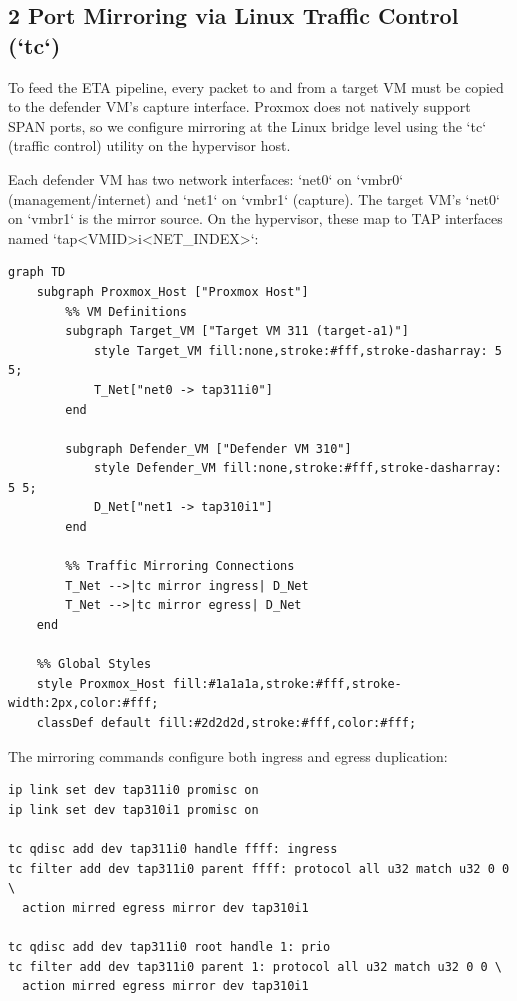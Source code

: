 \documentclass[conference]{IEEEtran}
\begin{document}
\subsection{2 Port Mirroring via Linux Traffic Control (`tc`)}

To feed the ETA pipeline, every packet to and from a target VM must be copied to the defender VM's capture interface. Proxmox does not natively support SPAN ports, so we configure mirroring at the Linux bridge level using the `tc` (traffic control) utility on the hypervisor host.

Each defender VM has two network interfaces: `net0` on `vmbr0` (management/internet) and `net1` on `vmbr1` (capture). The target VM's `net0` on `vmbr1` is the mirror source. On the hypervisor, these map to TAP interfaces named `tap<VMID>i<NET\_INDEX>`:

\begin{verbatim}
graph TD
    subgraph Proxmox_Host ["Proxmox Host"]
        %% VM Definitions
        subgraph Target_VM ["Target VM 311 (target-a1)"]
            style Target_VM fill:none,stroke:#fff,stroke-dasharray: 5 5;
            T_Net["net0 -> tap311i0"]
        end

        subgraph Defender_VM ["Defender VM 310"]
            style Defender_VM fill:none,stroke:#fff,stroke-dasharray: 5 5;
            D_Net["net1 -> tap310i1"]
        end

        %% Traffic Mirroring Connections
        T_Net -->|tc mirror ingress| D_Net
        T_Net -->|tc mirror egress| D_Net
    end

    %% Global Styles
    style Proxmox_Host fill:#1a1a1a,stroke:#fff,stroke-width:2px,color:#fff;
    classDef default fill:#2d2d2d,stroke:#fff,color:#fff;
\end{verbatim}

The mirroring commands configure both ingress and egress duplication:

\begin{verbatim}
ip link set dev tap311i0 promisc on
ip link set dev tap310i1 promisc on

tc qdisc add dev tap311i0 handle ffff: ingress
tc filter add dev tap311i0 parent ffff: protocol all u32 match u32 0 0 \
  action mirred egress mirror dev tap310i1

tc qdisc add dev tap311i0 root handle 1: prio
tc filter add dev tap311i0 parent 1: protocol all u32 match u32 0 0 \
  action mirred egress mirror dev tap310i1
\end{verbatim}
\end{document}
